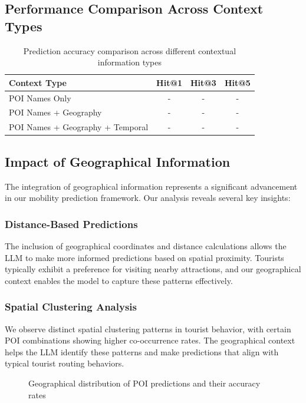 \documentclass[12pt,a4paper]{article}
\begin{document}
\subsection{Performance Comparison Across Context Types}

\begin{table}[H]
\centering
\caption{Prediction accuracy comparison across different contextual information types}
\label{tab:context_comparison}
\begin{tabular}{@{}lccc@{}}
\toprule
Context Type & Hit@1 & Hit@3 & Hit@5 \\
\midrule
POI Names Only & - & - & - \\
POI Names + Geography & - & - & - \\
POI Names + Geography + Temporal & - & - & - \\
\bottomrule
\end{tabular}
\end{table}

\subsection{Impact of Geographical Information}

The integration of geographical information represents a significant advancement in our mobility prediction framework. Our analysis reveals several key insights:

\subsubsection{Distance-Based Predictions}
The inclusion of geographical coordinates and distance calculations allows the LLM to make more informed predictions based on spatial proximity. Tourists typically exhibit a preference for visiting nearby attractions, and our geographical context enables the model to capture these patterns effectively.

\subsubsection{Spatial Clustering Analysis}
We observe distinct spatial clustering patterns in tourist behavior, with certain POI combinations showing higher co-occurrence rates. The geographical context helps the LLM identify these patterns and make predictions that align with typical tourist routing behaviors.

\begin{figure}[H]
\centering
\caption{Geographical distribution of POI predictions and their accuracy rates}
\label{fig:geographical_analysis}
\end{figure}
\end{document}
